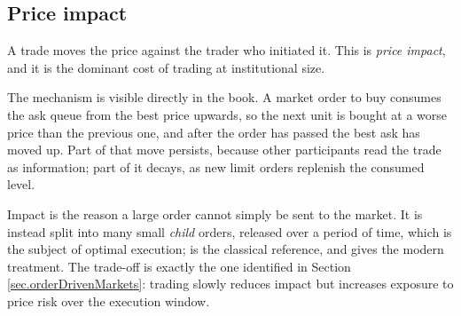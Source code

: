 \subsection{Price impact}
\label{sec.priceImpact}

A trade moves the price against the trader who initiated it.
This is \emph{price impact},
and it is the dominant cost of trading at institutional size.

The mechanism is visible directly in the book.
A market order to buy consumes the ask queue from the best price upwards,
so the next unit is bought at a worse price than the previous one,
and after the order has passed the best ask has moved up.
Part of that move persists,
because other participants read the trade as information;
part of it decays,
as new limit orders replenish the consumed level.

Impact is the reason a large order cannot simply be sent to the market.
It is instead split into many small \emph{child} orders,
released over a period of time,
which is the subject of optimal execution;
\cite{AC01opt} is the classical reference,
and \cite{CJP15alg} gives the modern treatment.
The trade-off is exactly the one identified in
Section \ref{sec.orderDrivenMarkets}:
trading slowly reduces impact but increases exposure to price risk over the execution
window.
